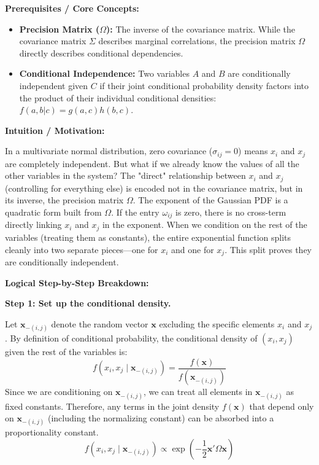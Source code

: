 \begin{solution}
\textbf{Prerequisites / Core Concepts:}
\begin{itemize}
    \item \textbf{Precision Matrix ($\Omega$):} The inverse of the covariance matrix. While the covariance matrix $\Sigma$ describes marginal correlations, the precision matrix $\Omega$ directly describes conditional dependencies.
    \item \textbf{Conditional Independence:} Two variables $A$ and $B$ are conditionally independent given $C$ if their joint conditional probability density factors into the product of their individual conditional densities: $f(a,b|c) = g(a,c)h(b,c)$.
\end{itemize}

\textbf{Intuition / Motivation:}

In a multivariate normal distribution, zero covariance ($\sigma_{ij} = 0$) means $x_i$ and $x_j$ are completely independent. But what if we already know the values of all the other variables in the system? The "direct" relationship between $x_i$ and $x_j$ (controlling for everything else) is encoded not in the covariance matrix, but in its inverse, the precision matrix $\Omega$. The exponent of the Gaussian PDF is a quadratic form built from $\Omega$. If the entry $\omega_{ij}$ is zero, there is no cross-term directly linking $x_i$ and $x_j$ in the exponent. When we condition on the rest of the variables (treating them as constants), the entire exponential function splits cleanly into two separate pieces—one for $x_i$ and one for $x_j$. This split proves they are conditionally independent.

\textbf{Logical Step-by-Step Breakdown:}

\textbf{Step 1: Set up the conditional density.}

Let $\mathbf{x}_{-(i,j)}$ denote the random vector $\mathbf{x}$ excluding the specific elements $x_i$ and $x_j$.
By definition of conditional probability, the conditional density of $(x_i, x_j)$ given the rest of the variables is:
\[ f(x_i, x_j \mid \mathbf{x}_{-(i,j)}) = \frac{f(\mathbf{x})}{f(\mathbf{x}_{-(i,j)})} \]
Since we are conditioning on $\mathbf{x}_{-(i,j)}$, we can treat all elements in $\mathbf{x}_{-(i,j)}$ as fixed constants. Therefore, any terms in the joint density $f(\mathbf{x})$ that depend only on $\mathbf{x}_{-(i,j)}$ (including the normalizing constant) can be absorbed into a proportionality constant.
\[ f(x_i, x_j \mid \mathbf{x}_{-(i,j)}) \propto \exp\left( -\frac{1}{2} \mathbf{x}' \Omega \mathbf{x} \right) \]


\end{solution}
